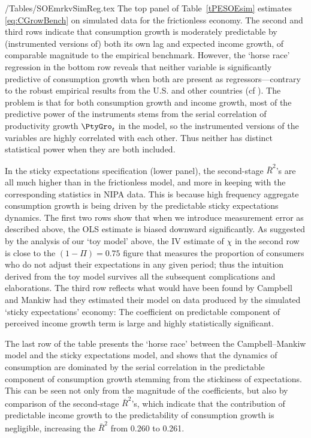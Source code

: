 \documentclass[titlepage]{\econtex}
\begin{document}
\econtexRoot/Tables/SOEmrkvSimReg.tex
The top panel of Table~\ref{tPESOEsim} estimates \eqref{eq:CGrowBench} on simulated data for the frictionless economy.  The second and third rows indicate that consumption growth is moderately predictable by (instrumented versions of) both its own lag and expected income growth, of comparable magnitude to the empirical benchmark.  However, the `horse race' regression in the bottom row reveals that neither variable is significantly predictive of consumption growth when both are present as regressors---contrary to the robust empirical results from the U.S. and other countries (cf \cite{cssIntlStickyC}).  The problem is that for both consumption growth and income growth, most of the predictive power of the instruments stems from the serial correlation of productivity growth $\PtyGro_t$ in the model, so the instrumented versions of the variables are highly correlated with each other.  Thus neither has distinct statistical power when they are both included.

In the sticky expectations specification (lower panel), the second-stage $\bar{R}^{2}$'s are all much higher than in the frictionless model, and more in keeping with the corresponding statistics in NIPA data. This is because high frequency aggregate consumption growth is being driven by the predictable sticky expectations dynamics. The first two rows show that when we introduce measurement error as described above, the OLS estimate is biased downward significantly. As suggested by the analysis of our `toy model' above, the IV estimate of $\chi$ in the second row is close to the $(1-\Pi)=0.75$ figure that measures the proportion of consumers who do not adjust their expectations in any given period; thus the intuition derived from the toy model survives all the subsequent complications and elaborations. The third row reflects what would have been found by Campbell and Mankiw had they estimated their model on data produced by the simulated `sticky expectations' economy:  The coefficient on predictable component of perceived income growth term is large and highly statistically significant.

The last row of the table presents the `horse race' between the Campbell--Mankiw model and the sticky expectations model, and shows that the dynamics of consumption are dominated by the serial correlation in the predictable component of consumption growth stemming from the stickiness of expectations.  This can be seen not only from the magnitude of the coefficients, but also by comparison of the second-stage $\bar{R}^{2}$'s, which indicate that the contribution of predictable income growth to the predictability of consumption growth is negligible, increasing the $\bar{R}^2$ from 0.260 to 0.261.
\end{document}
